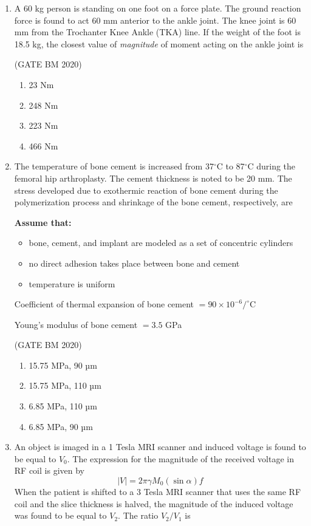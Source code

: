 \documentclass[journal]{IEEEtran}
\begin{document}
\begin{enumerate}
\item A 60 kg person is standing on one foot on a force plate. The ground reaction force is found to act 60 mm anterior to the ankle joint. The knee joint is 60 mm from the Trochanter Knee Ankle (TKA) line. If the weight of the foot is 18.5 kg, the closest value of \textit{magnitude} of moment acting on the ankle joint is


	\hfill(GATE BM 2020)

\begin{multicols}{4}
\begin{enumerate}
  \item 23 Nm
  \item 248 Nm
  \item 223 Nm
  \item 466 Nm
\end{enumerate}
\end{multicols}

\item The temperature of bone cement is increased from 37$^\circ$C to 87$^\circ$C during the femoral hip arthroplasty. The cement thickness is noted to be 20 mm. The stress developed due to exothermic reaction of bone cement during the polymerization process and shrinkage of the bone cement, respectively, are

\textbf{Assume that:}
\begin{itemize}
  \item bone, cement, and implant are modeled as a set of concentric cylinders
  \item no direct adhesion takes place between bone and cement
  \item temperature is uniform
\end{itemize}

Coefficient of thermal expansion of bone cement $= 90 \times 10^{-6}/^\circ$C

Young’s modulus of bone cement $= 3.5$ GPa


\hfill(GATE BM 2020)
\begin{multicols}{2}
\begin{enumerate}
  \item 15.75 MPa, 90 µm
  \item 15.75 MPa, 110 µm
  \item 6.85 MPa, 110 µm
  \item 6.85 MPa, 90 µm
\end{enumerate}
\end{multicols}


\item An object is imaged in a 1 Tesla MRI scanner and induced voltage is found to be equal to $V_0$. The expression for the magnitude of the received voltage in RF coil is given by
\[
|V| = 2 \pi \gamma M_0 (\sin \alpha) f
\]
When the patient is shifted to a 3 Tesla MRI scanner that uses the same RF coil and the slice thickness is halved, the magnitude of the induced voltage was found to be equal to $V_2$. The ratio $V_2/V_1$ is



\end{enumerate}
\end{document}
